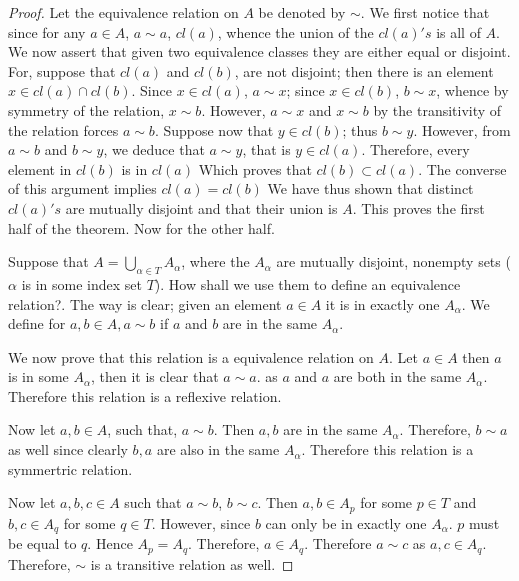  \begin{proof}
 Let the equivalence relation on \( A  \) be denoted by \( \sim  \). We first notice that since for any \( a \in A  \), \( a \sim  a \), \( cl(a) \), whence the union of the \( cl(a)'s \) is all of \( A \).
 We now assert that given two equivalence classes they are either equal or disjoint. For, suppose that \( cl(a) \) and \( cl(b)  \), are not disjoint; then there is an element \( x \in  cl(a) \cap cl(b)\). Since
 \( x \in  cl(a) \), \( a \sim x  \); since \( x \in  cl(b) \), \( b \sim x \), whence by symmetry of the relation, \( x \sim  b \). However, \( a \sim  x \) and \( x \sim b \) by the transitivity of the relation forces \( a \sim b \). Suppose
now that \( y \in  cl(b) \); thus \( b \sim y \). However, from \( a \sim  b \) and \( b \sim  y \), we deduce that \( a \sim  y \), that is \( y \in   cl(a) \). Therefore, every element in \( cl(b) \) is in \( cl(a) \)
Which proves that \( cl(b) \subset cl(a) \). The converse of this argument implies \( cl(a) = cl(b) \)
We have thus shown that distinct \( cl(a)'s \) are mutually disjoint and that
their union is \( A \). This proves the first half of the theorem. Now for the other half.

Suppose that \( A = \bigcup_{\alpha  \in  T} A_{\alpha}  \), where the \( A_{\alpha } \) are mutually disjoint, nonempty sets (\( \alpha  \) is in some index set \( T \)). How shall we use them to define an equivalence
relation?. The way is clear; given an element \( a \in  A \) it is in exactly one \( A_{\alpha } \). We define for \( a,b \in A, a \sim b \)
if \( a  \) and \( b \) are in the same \( A_{\alpha } \). 

We now prove that this relation is a equivalence relation on \( A \). Let \( a \in  A \) then \( a  \) is in some \( A_{\alpha}\),  then it is clear that \( a \sim  a \).
as \( a  \) and \( a \) are both in the same \( A_{\alpha} \). Therefore this relation is a reflexive relation.

Now let \( a, b \in A \), such that, \( a \sim  b \). Then \( a,b  \) are in the same \( A_{\alpha } \). Therefore, \( b \sim  a \) as well since clearly \( b,a \) are also in the same \( A_{\alpha } \).
Therefore this relation is a symmertric relation.

Now let \( a, b, c \in A \) such that \( a \sim b   \), \( b \sim c \). Then \( a,b \in A_{p} \) for some \( p \in T \) and \( b,c \in A_{q} \) for some \( q \in T \).
However, since \( b  \) can only be in exactly one \( A_{\alpha } \). \( p \) must be equal to \( q \). Hence \( A_{p}  = A_{q} \). Therefore, \( a \in A_{q} \). Therefore \( a \sim c  \) as \( a,c \in  A_{q} \).
Therefore, \( \sim  \) is a transitive relation as well.


\end{proof}
